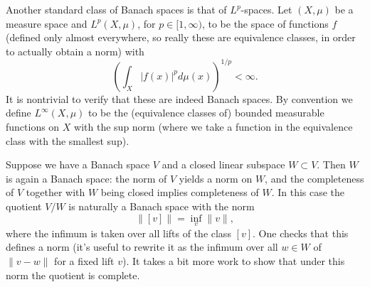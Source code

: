 \documentclass{amsart}
\begin{document}
Another standard class of Banach spaces is that of $L^p$-spaces. Let
$(X,\mu)$ be a measure space and $L^p(X,\mu)$, for $p\in[1,\infty)$,
to be the space of functions $f$ (defined only almost everywhere, so
really these are equivalence classes, in order to actually obtain a
norm) with
\begin{equation*}
    \left( \int_X |f(x)|^p d\mu(x) \right)^{1/p}<\infty.
\end{equation*}
It is nontrivial to verify that these are indeed Banach spaces. By
convention we define $L^\infty(X,\mu)$ to be the (equivalence classes of)
bounded measurable functions on $X$ with the sup norm (where we take
a function in the equivalence class with the smallest sup).

Suppose we have a Banach space $V$ and a closed linear subspace
$W\subset V$. Then $W$ is again a Banach space: the norm of $V$ yields
a norm on $W$, and the completeness of $V$ together with $W$ being
closed implies completeness of $W$. In this case the quotient $V/W$
is naturally a Banach space with the norm
\begin{equation*}
    \lVert [v]\rVert = \inf_v \lVert v\rVert,
\end{equation*}
where the infimum is taken over all lifts of the class $[v]$. One checks
that this defines a norm (it's useful to rewrite it as the infimum over
all $w\in W$ of $\lVert v-w\rVert$ for a fixed lift $v$). It takes a bit
more work to show that under this norm the quotient is complete.
\end{document}
